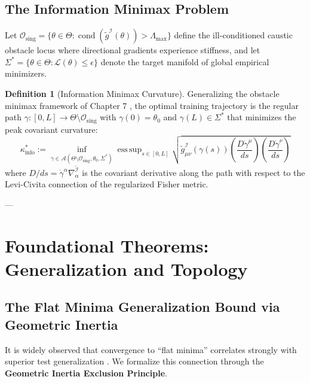\documentclass[11pt,reqno]{amsart}
\theoremstyle{definition}
\newtheorem{definition}[theorem]{Definition}
\newcommand{\Fisher}{\mathcal{I}}
\newcommand{\Loss}{\mathcal{L}}
\numberwithin{equation}{section}
\begin{document}
\subsection{The Information Minimax Problem}
Let $\mathcal{O}_{\mathrm{sing}} = \{ \theta \in \Theta : \operatorname{cond}(\tilde{g}^{\Fisher}(\theta)) > \Lambda_{\max} \}$ define the ill-conditioned caustic obstacle locus where directional gradients experience stiffness, and let $\Sigma^* = \{ \theta \in \Theta : \Loss(\theta) \le \epsilon \}$ denote the target manifold of global empirical minimizers.

\begin{definition}[Information Minimax Curvature]
Generalizing the obstacle minimax framework of Chapter 7 \cite{silvafilho2026minimax, dubins1957}, the optimal training trajectory is the regular path $\gamma: [0, L] \to \Theta \setminus \mathcal{O}_{\mathrm{sing}}$ with $\gamma(0) = \theta_0$ and $\gamma(L) \in \Sigma^*$ that minimizes the peak covariant curvature:
\begin{equation}
\kappa^*_{\mathrm{info}} := \inf_{\gamma \in \mathcal{A}(\Theta \setminus \mathcal{O}_{\mathrm{sing}}, \theta_0, \Sigma^*)} \operatorname{ess\,sup}_{s \in [0, L]} \sqrt{ \tilde{g}^{\Fisher}_{\mu\nu}(\gamma(s)) \left(\frac{D \dot{\gamma}^\mu}{ds}\right) \left(\frac{D \dot{\gamma}^\nu}{ds}\right) }
\end{equation}
where $D/ds = \dot{\gamma}^\alpha \nabla^{\tilde{\Fisher}}_\alpha$ is the covariant derivative along the path with respect to the Levi-Civita connection of the regularized Fisher metric.
\end{definition}

---

\section{Foundational Theorems: Generalization and Topology}

\subsection{The Flat Minima Generalization Bound via Geometric Inertia}
It is widely observed that convergence to ``flat minima'' correlates strongly with superior test generalization \cite{hochreiter1997, keskar2016, dziugaite2017}. We formalize this connection through the \textbf{Geometric Inertia Exclusion Principle}.
\end{document}
